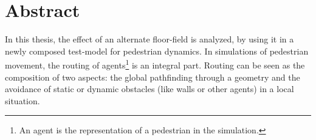 \section*{Abstract}

In this thesis, the effect of an alternate floor-field is analyzed, by using it in a newly composed test-model for pedestrian dynamics. In simulations of pedestrian movement, the routing of agents\footnote{An agent is the representation of a pedestrian in the simulation.} is an integral part. Routing can be seen as the composition of two aspects: the global pathfinding through a geometry and the avoidance of static or dynamic obstacles (like walls or other agents) in a local situation.

